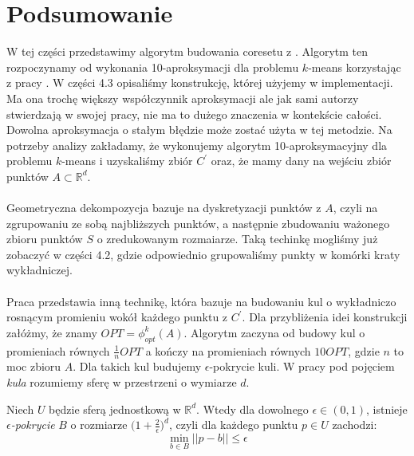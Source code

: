 \section{Podsumowanie}

W tej części przedstawimy algorytm budowania coresetu z \cite{DBLP:journals/ki/MunteanuS18}.
Algorytm ten rozpoczynamy od wykonania 10-aproksymacji dla problemu $k$-means korzystając z pracy \cite{Arya2004LocalSH}.
W części 4.3 opisaliśmy konstrukcję, której użyjemy w implementacji.
Ma ona trochę większy współczynnik aproksymacji ale jak sami autorzy \cite{DBLP:journals/ki/MunteanuS18} stwierdzają w swojej pracy, nie ma to dużego znaczenia w kontekście całości.
Dowolna aproksymacja o stałym błędzie może zostać użyta w tej metodzie.
Na potrzeby analizy zakładamy, że wykonujemy algorytm 10-aproksymacyjny dla problemu $k$-means i uzyskaliśmy zbiór $C^{'}$ oraz, że mamy dany na wejściu zbiór punktów $A \subset \mathbb{R}^d$.
\\~\\
Geometryczna dekompozycja bazuje na dyskretyzacji punktów z $A$, czyli na zgrupowaniu ze sobą najbliższych punktów, a następnie zbudowaniu ważonego zbioru punktów $S$ o zredukowanym rozmaiarze.
Taką techinkę mogliśmy już zobaczyć w części 4.2, gdzie odpowiednio grupowaliśmy punkty w komórki kraty wykładniczej.
\\~\\
Praca \cite{DBLP:journals/ki/MunteanuS18} przedstawia inną technikę, która bazuje na budowaniu kul o wykładniczo rosnącym promieniu wokół każdego punktu z $C^{'}$.
Dla przybliżenia idei konstrukcji załóżmy, że znamy $OPT = \phi_{opt}^{k}(A)$.
Algorytm zaczyna od budowy kul o promieniach równych $\frac{1}{n}OPT$ a kończy na promieniach równych $10 OPT$, gdzie $n$ to moc zbioru $A$.
Dla takich kul budujemy $\epsilon$-pokrycie kuli.
W pracy pod pojęciem \textit{kula} rozumiemy sferę w przestrzeni o wymiarze $d$.

\begin{lemma}{\cite{pisier_1989}}
    Niech $U$ będzie sferą jednostkową w $\mathbb{R}^{d}$.
    Wtedy dla dowolnego $\epsilon \in (0,1)$, istnieje \textit{$\epsilon$-pokrycie} $B$ o rozmiarze $\Big(1 +\frac{2}{\epsilon}\Big)^{d}$, czyli dla każdego punktu $p \in U$ zachodzi:
    \begin{equation}
        \min_{b \in B} ||p-b|| \leq \epsilon
    \end{equation}
\end{lemma}

